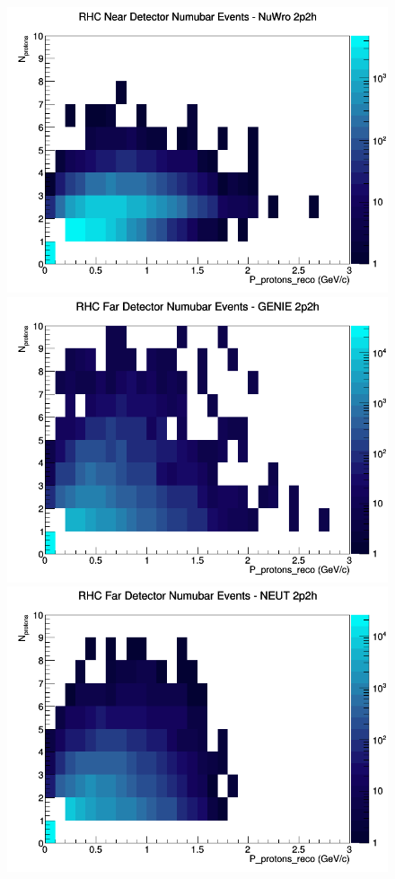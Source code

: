 \documentclass[12pt]{article}
\begin{document}
\begin{figure}[h]
\includegraphics[width=\linewidth]{eff_N_P/LAr/protons/2p2h_RHC_ND_numubar_N_P_NuWro.png}
\endminipage
\newline
{}
\includegraphics[width=\linewidth]{eff_N_P/LAr/protons/2p2h_RHC_FD_numubar_N_P_GENIE.png}
\endminipage
{}
\includegraphics[width=\linewidth]{eff_N_P/LAr/protons/2p2h_RHC_FD_numubar_N_P_NEUT.png}

\end{figure}
\end{document}
